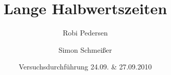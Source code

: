 \documentclass[a4paper,oneside]{scrartcl} %
\title{Lange Halbwertszeiten}
\author{Robi Pedersen \and Simon Schmeißer}
\date{Versuchsdurchführung 24.09. \& 27.09.2010}
\begin{document}
\begin{titlepage}
  \maketitle
  \vfill
  \thispagestyle{empty}
\end{titlepage}

\tableofcontents
\clearpage








\clearpage

% 
%
\end{document}
